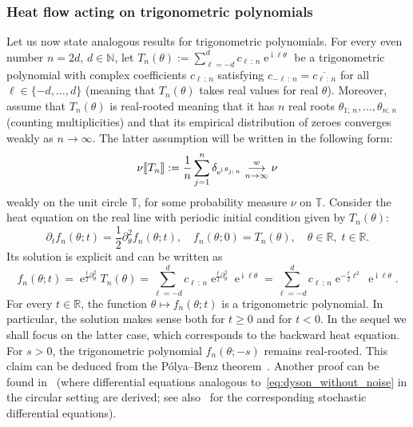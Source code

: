 \documentclass[AHL,Unicode,longabstracts,published]{cedram}
\newcommand{\llbracket}{\mathopen{[\mkern -2.7mu[}}
\newcommand{\rrbracket}{\mathclose{]\mkern -2.7mu]}}
\newcommand{\lsem}{\llbracket}
\newcommand{\rsem}{\rrbracket}
\DeclareMathOperator{\eee}{e}
\DeclareMathOperator{\ii}{i}
\newcommand{\bT}{\mathbb{T}}
\newcommand{\R}{\mathbb{R}}
\newcommand{\N}{\mathbb{N}}
\newcommand{\toweak}{\overset{w}{\underset{n\to\infty}\longrightarrow}}
\begin{document}
\subsubsection{Heat flow acting on trigonometric polynomials}

Let us now state analogous results for trigonometric polynomials. For every even number $n=2d$, $d\in \N$, let $T_{n} (\theta) := \sum_{\ell= -d}^d c_{\ell\,:\,n} \eee^{\ii \ell \theta}$ be a trigonometric polynomial with complex coefficients $c_{\ell\,:\,n}$ satisfying $c_{-\ell\,:\,n} = \overline{c_{\ell\,:\,n}}$ for all $\ell\in \{-d,\ldots, d\}$ (meaning that $T_n(\theta)$ takes real values for real $\theta$). Moreover, assume that $T_{n}(\theta)$ is real-rooted meaning that it has $n$ real roots $\theta_{1;\,n},\ldots, \theta_{n;\,n}$ (counting multiplicities) and that its empirical distribution of zeroes converges weakly as $n\to\infty$. The latter assumption will be written in the following form:
\begin{equation}\label{eq:empirical_distr_zeroes_conv}
\nu\lsem T_{n}\rsem := \frac {1}{n} \sum_{j=1}^{n} \delta_{\eee^{\ii \theta_{j;\,n}}} \toweak \nu
\end{equation}
weakly on the unit circle $\bT$, for some probability measure $\nu$ on $\bT$. Consider the heat equation on the real line with periodic initial condition given by $T_n(\theta)$:
\begin{equation}\label{eq:heat_equation}
\partial_t f_{n}(\theta; t) = \frac 12 \partial^2_\theta f_{n}(\theta;t),
\quad f_n(\theta; 0) = T_{n}(\theta),
\quad
\theta\in \R, \; t\in \R.
\end{equation}
Its solution is explicit and can be written as
\begin{equation}\label{eq:heat_eq_solution}
f_{n} (\theta; t) =
\eee^{\frac t2 \partial_\theta^2} T_{n}(\theta) =
\sum_{\ell= -d}^d c_{\ell\,:\,n} \eee^{\frac t2 \partial_\theta^2} \eee^{\ii \ell \theta} =
\sum_{\ell = -d}^d c_{\ell\,:\,n} \eee^{-\frac t2 \ell^2} \eee^{\ii \ell \theta}.
\end{equation}
For every $t\in \R$, the function $\theta \mapsto f_{n} (\theta; t)$ is a trigonometric polynomial. In particular, the solution makes sense both for $t\geq 0$ and for $t<0$. In the sequel we shall focus on the latter case, which corresponds to the backward heat equation. For $s>0$, the trigonometric polynomial $f_n(\theta; -s)$ remains real-rooted. This claim can be deduced from the Pólya--Benz theorem~\cite[Corollary~1.3]{aleman_beliaev_hedenmalm}. Another proof can be found in~\cite{tao_blog2} (where differential equations analogous to~\eqref{eq:dyson_without_noise} in the circular setting are derived; see also~\cite{cepa_lepingle_circle,hobson_werner} for the corresponding stochastic differential equations).
\end{document}
